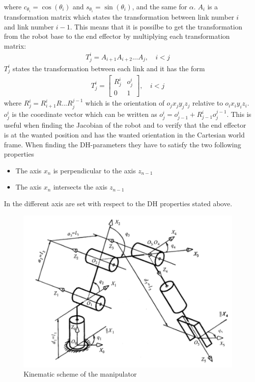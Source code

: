 where $c_{\theta_i} = \cos{(\theta_i)}$ and $s_{\theta_i} = \sin{(\theta_i)}$, and the same for $\alpha$. $A_i$ is a transformation matrix which states the transformation between link number $i$ and link number $i-1$. This means that it is possilbe to get the transformation from the robot base to the end effector by multiplying each transformation matrix:
\begin{align*}
    T^i_j = A_{i+1}A_{i+2}...A_j, \quad i<j
\end{align*}
 $T^i_j$ states the transformation between each link and it has the form
 \begin{align*}
      T^i_j = 
      \begin{bmatrix}
          R^i_j & o^i_j\\
          0&1
      \end{bmatrix}, \quad i<j
 \end{align*}
 where $R^i_j = R^i_{i+1}R...R^{j-1}_j$ which is the orientation of $o_jx_jy_jz_j$ relative to $o_ix_iy_iz_i$. $o^i_j$ is the coordinate vector which can be written as $o^i_j = o^i_{j-1}+R^{i}_{j-1}o^{j-1}_j$. This is useful when finding the Jacobian of the robot and to verify that the end effector is at the wanted position and has the wanted orientation in the Cartesian world frame. When finding the DH-parameters they have to satisfy the two following properties \cite{spong}
 \begin{itemize}
     \item The axis $x_n$ is perpendicular to the axis $z_{n-1}$
     \item The axis $x_n$ intersects the axis $z_{n-1}$
 \end{itemize}
In  the different axis are set with respect to the DH properties stated above\cite{Kinematics}. 
\begin{figure}[htbp]
  \centering
  \includegraphics[width=.9\textwidth]{img/DHconv.png}
  \caption{Kinematic scheme of the manipulator}
  \label{fig:dhf}
\end{figure}
